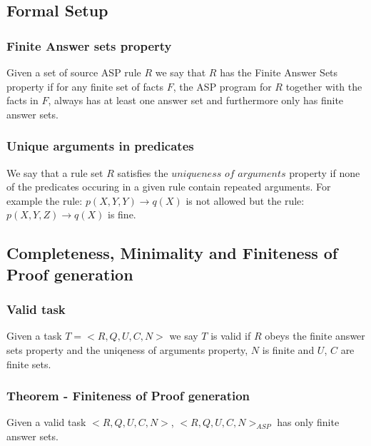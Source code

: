 \documentclass{article}
\begin{document}
\subsection{Formal Setup}
\subsubsection{Finite Answer sets property}
Given a set of source ASP rule $R$ we say that $R$ has the Finite Answer Sets property if for any finite set of facts $F$, the ASP program for $R$ together with the facts in $F$, always has at least one answer set and furthermore only has finite answer sets.
 \subsubsection{Unique arguments in predicates}
We say that a rule set $R$ satisfies the $uniqueness$ $of$ $arguments$ property if none of the predicates occuring in a given rule contain repeated arguments. For example the rule:
$p(X,Y,Y)\rightarrow q(X)$ is not allowed but the rule: $p(X,Y,Z)\rightarrow q(X)$ is fine. 

\subsection{Completeness, Minimality and Finiteness of Proof generation}
\subsubsection{Valid task}
Given a task $T = <R,Q,U,C,N>$ we say $T$ is valid if $R$ obeys the finite answer sets property and the uniqeness of arguments property, $N$ is finite and $U$, $C$ are finite sets. 
\subsubsection{Theorem - Finiteness of Proof generation}
Given a valid task $<R,Q,U,C,N>$, $<R,Q,U,C,N>_{ASP}$ has only finite answer sets. 
\end{document}
